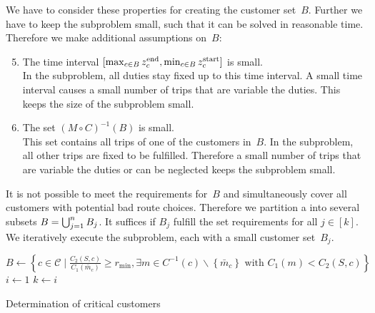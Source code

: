 We have to consider these properties for creating the customer set~$B$. Further we have to keep the subproblem small, such that it can be solved in reasonable time. Therefore we make additional assumptions on~$B$:
\begin{enumerate}
\setcounter{enumi}{4}
	\item The time interval ${[\max_{c\in B}z^{\operatorname{end}}_c, \min_{c\in B}z^{\operatorname{start}}_c]}$ is small. \\
	In the subproblem, all duties stay fixed up to this time interval. A small time interval causes a small number of trips that are variable \wrt the duties. This keeps the size of the subproblem small.
	\item The set ${(M\circ C)^{-1}(B)}$ is small. \\
	This set contains all trips of one of the customers in~$B$. In the subproblem, all other trips are fixed to be fulfilled. Therefore a small number of trips that are variable \wrt the duties or can be neglected keeps the subproblem small.
\end{enumerate}

It is not possible to meet the requirements for~$B$ and simultaneously cover all customers with potential bad route choices. Therefore we partition a into several subsets ${B=\bigcup_{j=1}^n B_j}$. It suffices if $B_j$ fulfill the set requirements for all ${j\in[k]}$. We iteratively execute the subproblem, each with a small customer set~$B_j$.

\begin{algorithm}[htb]
	\SetAlgoLined
	$B\gets\left\{c\in\mathcal{C}\mid\frac{C_2(S,c)}{C_1\left(\bar{m}_c\right)}\geq r_{\min}, \exists m\in C^{-1}(c)\backslash\left\{\bar{m}_c\right\} \text{ with } C_1(m)<C_2(S,c)\right\}$\;
	$i\gets 1$\;
	$k\gets i$\;
	\caption{Determination of critical customers}
	\label{alg:critical_customers}
\end{algorithm}

